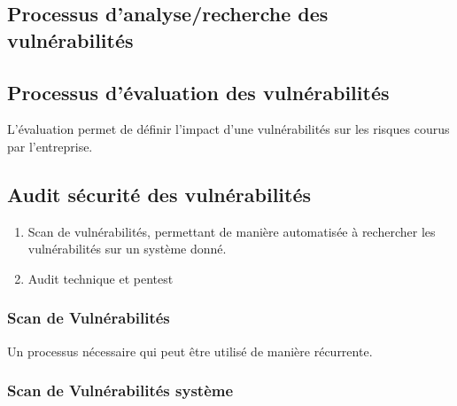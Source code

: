 


\subsection{Processus d’analyse/recherche des vulnérabilités}


\subsection{Processus d’évaluation des vulnérabilités}

L'évaluation permet de définir l'impact d'une vulnérabilités sur les risques courus par l'entreprise.






\subsection{Audit sécurité des vulnérabilités}

\begin{enumerate}
	\item Scan de vulnérabilités, permettant de manière automatisée à rechercher les vulnérabilités sur un système donné.
	\item Audit technique et pentest
\end{enumerate}

\subsubsection{Scan de Vulnérabilités}
Un processus nécessaire qui peut être utilisé de manière récurrente.

\subsubsection{Scan de Vulnérabilités système}


